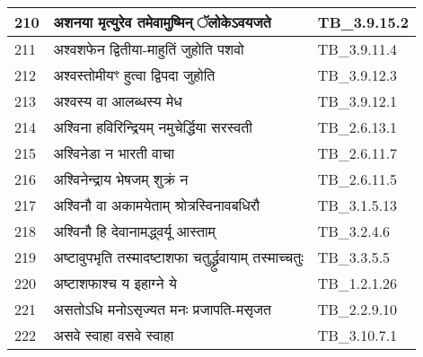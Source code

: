 \documentclass[17pt]{extarticle}
\begin{document}
\begin{longtable}{||p{0.4in}||p{4.9in}||p{0.9in}||}
    210 & अशनया मृत्युरेव तमेवामुष्मिन् ॅलोकेऽवयजते & TB\_3.9.15.2       \\
    
    \hline
        
    211 & अश्वशफेन द्वितीया{-}माहुतिं जुहोति पशवो & TB\_3.9.11.4       \\
    
    \hline
        
    212 & अश्वस्तोमीयꣳ हुत्वा द्विपदा जुहोति & TB\_3.9.12.3       \\
    
    \hline
        
    213 & अश्वस्य वा आलब्धस्य मेध & TB\_3.9.12.1       \\
    
    \hline
        
    214 & अश्विना हविरिन्द्रियम् नमुचेर्द्धिया सरस्वती & TB\_2.6.13.1       \\
    
    \hline
        
    215 & अश्विनेडा न भारती वाचा & TB\_2.6.11.7       \\
    
    \hline
        
    216 & अश्विनेन्द्राय भेषजम् शुक्रं न & TB\_2.6.11.5       \\
    
    \hline
        
    217 & अश्विनौ वा अकामयेताम् श्रोत्रस्विनावबधिरौ & TB\_3.1.5.13       \\
    
    \hline
        
    218 & अश्विनौ हि देवानामद्ध्वर्यू आस्ताम् & TB\_3.2.4.6       \\
    
    \hline
        
    219 & अष्टावुपभृति तस्मादष्टाशफा चतुर्द्ध्रुवायाम् तस्माच्चतुः & TB\_3.3.5.5       \\
    
    \hline
        
    220 & अष्टाशफाश्च य इहाग्ने ये & TB\_1.2.1.26       \\
    
    \hline
        
    221 & असतोऽधि मनोऽसृज्यत मनः प्रजापति{-}मसृजत & TB\_2.2.9.10       \\
    
    \hline
        
    222 & असवे स्वाहा वसवे स्वाहा & TB\_3.10.7.1       \\
    

\end{longtable}
\end{document}
